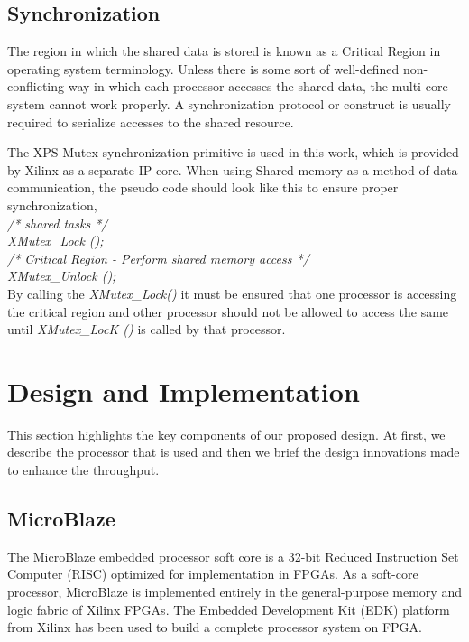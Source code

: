 \documentclass[preprint,12pt]{elsarticle}
\begin{document}
\subsection{Synchronization}
\label{sync}
The region in which the shared data is stored is known as a Critical Region
in operating system terminology. Unless there is some sort of well-defined non-conflicting way in
which each processor accesses the shared data, the multi core system cannot work properly. A synchronization protocol or construct
is usually required to serialize accesses to the shared resource.
\par The XPS Mutex synchronization primitive is used in this work, which is provided by Xilinx as a separate IP-core\cite{dual}.
When using Shared memory as a method of data communication, the pseudo code should look like this to ensure proper synchronization,\\
{\em /* shared tasks */}\\
{\em XMutex\_Lock ();}\\
{\em /* Critical Region - Perform shared memory access */}\\
{\em XMutex\_Unlock ();}\\

By calling the {\em XMutex\_Lock()} it must be ensured that one processor is accessing the critical region and other processor should not be allowed to access the same until {\em XMutex\_LocK ()} is called by that processor.

\vspace{-10pt}
\section{Design and Implementation}
This section highlights the key components of our proposed design. At first, we describe the processor that is used and then we brief the design innovations made to enhance the throughput.
\subsection{MicroBlaze}
The MicroBlaze embedded processor soft core is a 32-bit Reduced Instruction Set Computer (RISC) optimized for implementation in FPGAs\cite{mbl}. As a soft-core processor, MicroBlaze is implemented entirely in the general-purpose memory and logic fabric of Xilinx FPGAs. The Embedded Development Kit (EDK) platform from Xilinx has been used to build a complete processor system on FPGA.
\end{document}
